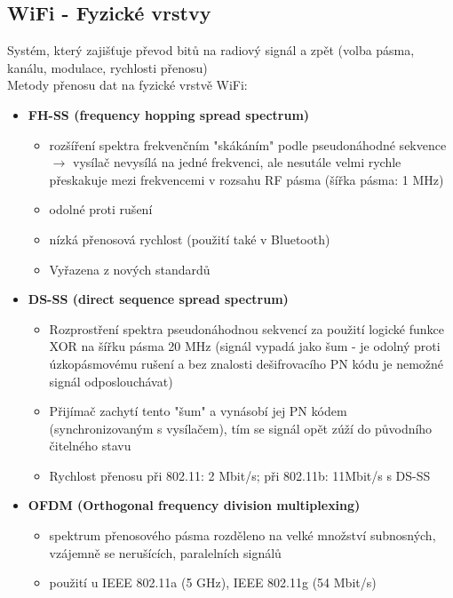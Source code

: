 \subsection{WiFi - Fyzické vrstvy}
Systém, který zajišťuje převod bitů na radiový signál a zpět (volba pásma, kanálu, modulace, rychlosti přenosu)\\
Metody přenosu dat na fyzické vrstvě WiFi:
\begin{itemize}	
	\item \textbf{FH-SS (frequency hopping spread spectrum)}
	\begin{itemize}	
		\item rozšíření spektra frekvenčním "skákáním" podle pseudonáhodné sekvence $\rightarrow$ vysílač nevysílá na jedné frekvenci, ale nesutále velmi rychle přeskakuje mezi frekvencemi v rozsahu RF pásma (šířka pásma: 1 MHz)
		\item odolné proti rušení
		\item nízká přenosová rychlost (použití také v Bluetooth)
		\item Vyřazena z nových standardů
	\end{itemize}
	\item \textbf{DS-SS (direct sequence spread spectrum)}
	\begin{itemize}	
		\item Rozprostření spektra pseudonáhodnou sekvencí za použití logické funkce XOR na šířku pásma 20 MHz (signál vypadá jako šum - je odolný proti úzkopásmovému rušení a bez znalosti dešifrovacího PN kódu je nemožné signál odposlouchávat)
		\item Přijímač zachytí tento "šum" a vynásobí jej PN kódem (synchronizovaným s vysílačem), tím se signál opět zúží do původního čitelného stavu
		\item Rychlost přenosu při 802.11: 2 Mbit/s; při 802.11b: 11Mbit/s s DS-SS
	\end{itemize}
	\item \textbf{OFDM (Orthogonal frequency division multiplexing)}
	\begin{itemize}	
		\item spektrum přenosového pásma rozděleno na velké množství subnosných, vzájemně se nerušících, paralelních signálů
		\item použití u IEEE 802.11a (5 GHz),  IEEE 802.11g (54 Mbit/s)
	\end{itemize}
\end{itemize}
